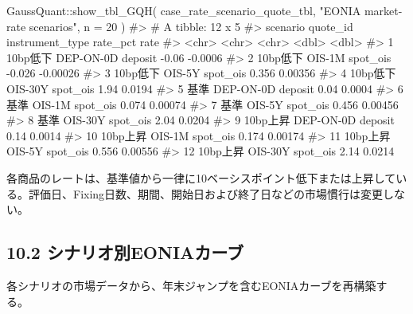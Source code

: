 \documentclass[
  letterpaper,
  DIV=11,
  numbers=noendperiod]{scrreprt}
\newenvironment{Shaded}{\begin{snugshade}}{\end{snugshade}}
\newcommand{\AttributeTok}[1]{\textcolor[rgb]{0.40,0.45,0.13}{#1}}
\newcommand{\CommentTok}[1]{\textcolor[rgb]{0.37,0.37,0.37}{#1}}
\newcommand{\DecValTok}[1]{\textcolor[rgb]{0.68,0.00,0.00}{#1}}
\newcommand{\FunctionTok}[1]{\textcolor[rgb]{0.28,0.35,0.67}{#1}}
\newcommand{\NormalTok}[1]{\textcolor[rgb]{0.00,0.23,0.31}{#1}}
\newcommand{\SpecialCharTok}[1]{\textcolor[rgb]{0.37,0.37,0.37}{#1}}
\newcommand{\StringTok}[1]{\textcolor[rgb]{0.13,0.47,0.30}{#1}}
\begin{document}
\begin{Shaded}
\begin{Highlighting}[]
\NormalTok{GaussQuant}\SpecialCharTok{::}\FunctionTok{show\_tbl\_GQH}\NormalTok{(}
\NormalTok{  case\_rate\_scenario\_quote\_tbl,}
  \StringTok{"EONIA market{-}rate scenarios"}\NormalTok{,}
  \AttributeTok{n =} \DecValTok{20}
\NormalTok{)}
\CommentTok{\#\textgreater{} \# A tibble: 12 x 5}
\CommentTok{\#\textgreater{}    scenario quote\_id  instrument\_type rate\_pct     rate}
\CommentTok{\#\textgreater{}    \textless{}chr\textgreater{}    \textless{}chr\textgreater{}     \textless{}chr\textgreater{}              \textless{}dbl\textgreater{}    \textless{}dbl\textgreater{}}
\CommentTok{\#\textgreater{}  1 10bp低下 DEP{-}ON{-}0D deposit           {-}0.06  {-}0.0006 }
\CommentTok{\#\textgreater{}  2 10bp低下 OIS{-}1M    spot\_ois          {-}0.026 {-}0.00026}
\CommentTok{\#\textgreater{}  3 10bp低下 OIS{-}5Y    spot\_ois           0.356  0.00356}
\CommentTok{\#\textgreater{}  4 10bp低下 OIS{-}30Y   spot\_ois           1.94   0.0194 }
\CommentTok{\#\textgreater{}  5 基準     DEP{-}ON{-}0D deposit            0.04   0.0004 }
\CommentTok{\#\textgreater{}  6 基準     OIS{-}1M    spot\_ois           0.074  0.00074}
\CommentTok{\#\textgreater{}  7 基準     OIS{-}5Y    spot\_ois           0.456  0.00456}
\CommentTok{\#\textgreater{}  8 基準     OIS{-}30Y   spot\_ois           2.04   0.0204 }
\CommentTok{\#\textgreater{}  9 10bp上昇 DEP{-}ON{-}0D deposit            0.14   0.0014 }
\CommentTok{\#\textgreater{} 10 10bp上昇 OIS{-}1M    spot\_ois           0.174  0.00174}
\CommentTok{\#\textgreater{} 11 10bp上昇 OIS{-}5Y    spot\_ois           0.556  0.00556}
\CommentTok{\#\textgreater{} 12 10bp上昇 OIS{-}30Y   spot\_ois           2.14   0.0214}
\end{Highlighting}
\end{Shaded}

各商品のレートは、基準値から一律に10ベーシスポイント低下または上昇している。評価日、Fixing日数、期間、開始日および終了日などの市場慣行は変更しない。

\subsection{10.2
シナリオ別EONIAカーブ}\label{ux30b7ux30caux30eaux30aaux5225eoniaux30abux30fcux30d6}

各シナリオの市場データから、年末ジャンプを含むEONIAカーブを再構築する。
\end{document}
